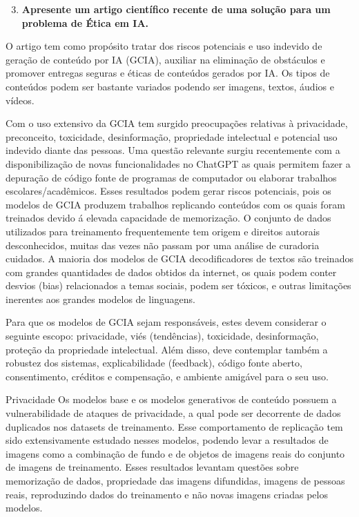 \begin{enumerate}\setcounter{enumi}{2}\bfseries
    \item  \textbf{Apresente um artigo científico recente de uma solução para um problema de Ética em IA.}
\end{enumerate}

O artigo \cite{chen_fu_lyu} tem como propósito tratar dos riscos potenciais e uso indevido de geração de conteúdo por IA (GCIA), auxiliar na eliminação de obstáculos e promover entregas seguras e éticas de conteúdos gerados por IA. Os tipos de conteúdos podem ser bastante variados podendo ser imagens, textos, áudios e vídeos. 


Com o uso extensivo da GCIA tem surgido preocupações relativas à privacidade, preconceito, toxicidade, desinformação, propriedade intelectual e potencial uso indevido diante das pessoas. Uma questão relevante surgiu recentemente com a disponibilização de novas funcionalidades no ChatGPT as quais permitem fazer a depuração de código fonte de programas de computador ou elaborar trabalhos escolares/acadêmicos. Esses resultados podem gerar riscos potenciais, pois os modelos de GCIA produzem trabalhos replicando conteúdos com os quais foram treinados devido á elevada capacidade de memorização. O conjunto de dados utilizados para treinamento frequentemente tem origem e direitos autorais desconhecidos, muitas das vezes não passam por uma análise de curadoria cuidados. A maioria dos modelos de GCIA decodificadores de textos são treinados com grandes quantidades de dados obtidos da internet, os quais podem conter desvios (bias) relacionados a temas sociais, podem ser tóxicos, e outras limitações inerentes aos grandes modelos de linguagens.

Para que os modelos de GCIA sejam responsáveis, estes devem considerar o seguinte escopo: privacidade, viés (tendências), toxicidade, desinformação, proteção da propriedade intelectual. Além disso, deve contemplar também a robustez dos sistemas, explicabilidade (feedback), código fonte aberto, consentimento, créditos e compensação, e ambiente amigável para o seu uso.


Privacidade
Os modelos base e os modelos generativos de conteúdo possuem a vulnerabilidade de ataques de privacidade, a qual pode ser decorrente de dados duplicados nos datasets de treinamento. Esse comportamento de replicação tem sido extensivamente estudado nesses modelos, podendo levar a resultados de imagens como a combinação de fundo e de objetos de imagens reais do conjunto de imagens de treinamento. Esses resultados levantam questões sobre memorização de dados, propriedade das imagens difundidas, imagens de pessoas reais, reproduzindo dados do treinamento e não novas imagens criadas pelos modelos.

